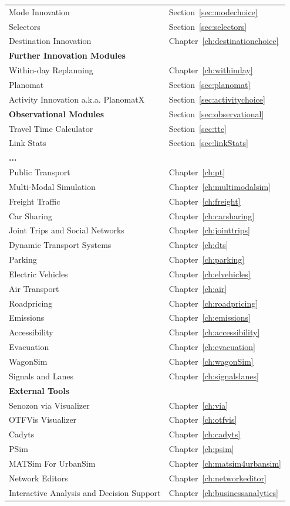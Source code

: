 \begin{center}
\begin{longtable}{|l|l|}
	Mode Innovation & Section~\ref{sec:modechoice} \\
	Selectors & Section~\ref{sec:selectors} \\
	Destination Innovation & Chapter~\ref{ch:destinationchoice} \\
	\hline
	\textbf{Further Innovation Modules} & \\
	\hline
	Within-day Replanning & Chapter~\ref{ch:withinday} \\
	Planomat & Section~\ref{sec:planomat} \\
	Activity Innovation a.k.a. PlanomatX & Section~\ref{sec:activitychoice} \\
	\hline
	\textbf{Observational Modules} & Section~\ref{sec:observational} \\
	\hline
	Travel Time Calculator & Section~\ref{sec:ttc} \\
	Link Stats & Section~\ref{sec:linkStats} \\
	\hline
	\textbf{...} & \\
	\hline
	Public Transport & Chapter~\ref{ch:pt} \\
	Multi-Modal Simulation & Chapter~\ref{ch:multimodalsim} \\
	Freight Traffic & Chapter~\ref{ch:freight} \\
	Car Sharing & Chapter~\ref{ch:carsharing} \\
	Joint Trips and Social Networks & Chapter~\ref{ch:jointtrips} \\
	Dynamic Transport Systems & Chapter~\ref{ch:dts} \\
	Parking & Chapter~\ref{ch:parking} \\
	Electric Vehicles & Chapter~\ref{ch:elvehicles} \\
	Air Transport & Chapter~\ref{ch:air} \\
	Roadpricing & Chapter~\ref{ch:roadpricing} \\
	Emissions & Chapter~\ref{ch:emissions} \\
	Accessibility & Chapter~\ref{ch:accessibility} \\
	Evacuation & Chapter~\ref{ch:evacuation}  \\
	WagonSim & Chapter~\ref{ch:wagonSim} \\
	Signals and Lanes & Chapter~\ref{ch:signalslanes} \\
	\hline
	\textbf{External Tools} & \\ %
	\hline
	Senozon via Visualizer & Chapter~\ref{ch:via} \\
	OTFVis Visualizer & Chapter~\ref{ch:otfvis} \\
	Cadyts & Chapter~\ref{ch:cadyts} \\
	PSim & Chapter~\ref{ch:psim} \\
	MATSim For UrbanSim & Chapter~\ref{ch:matsim4urbansim} \\	
	Network Editors &  Chapter~\ref{ch:networkeditor} \\
	Interactive Analysis and Decision Support & Chapter~\ref{ch:businessanalytics} \\
\end{longtable}
\end{center}



